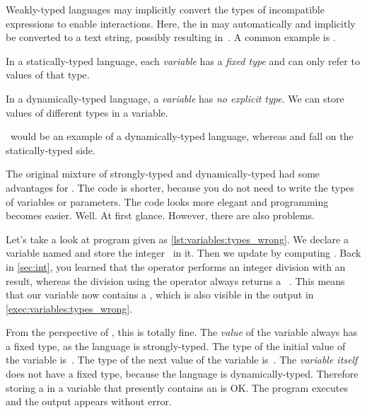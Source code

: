 %
Weakly-typed languages may implicitly convert the types of incompatible expressions to enable interactions.
Here, the  in  may automatically and implicitly be converted to a text string, possibly resulting in~.
A common example is .
%
\begin{definition}%
In a statically-typed language, each \emph{variable} has a \emph{fixed type} and can only refer to values of that type.%
\end{definition}%
%
\begin{definition}%
In a dynamically-typed language, a \emph{variable} has \emph{no explicit type}. %
We can store values of different types in a variable.%
\end{definition}%
%
\python\ would be an example of a dynamically-typed language, whereas  and  fall on the statically-typed side.

The original mixture of strongly-typed and dynamically-typed had some advantages for \python.
The code is shorter, because you do not need to write the types of variables or parameters.
The code looks more elegant and programming becomes easier.
Well.
At first glance.
However, there are also problems.

Let's take a look at program  given as \cref{lst:variables:types_wrong}.
We declare a variable named  and store the integer~ in it.
Then we update  by computing .
Back in \cref{sec:int}, you learned that the \pythonilIdx{//} operator performs an integer division with an  result, whereas the division using the \pythonilIdx{/} operator always returns a ~\cite{PEP238}.
This means that our variable  now contains a , which is also visible in the output in \cref{exec:variables:types_wrong}.

From the perspective of \python, this is totally fine.
The \emph{value} of the variable always has a fixed type, as the language is strongly-typed.
The type of the initial value of the variable is~.
The type of the next value of the variable is~.
The \emph{variable itself} does not have a fixed type, because the language is dynamically-typed.
Therefore storing a  in a variable that presently contains an  is OK.
The program executes and the output appears without error.


